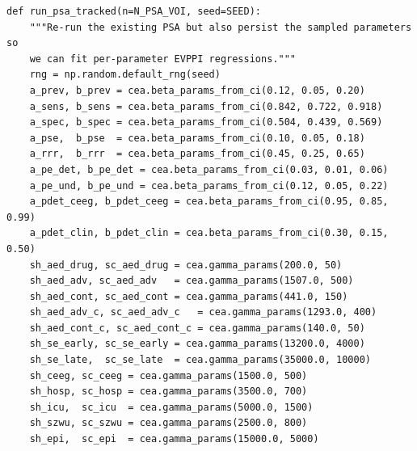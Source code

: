 \documentclass[11pt,a4paper]{article}
\begin{document}
\begin{lstlisting}[style=codeblock]
def run_psa_tracked(n=N_PSA_VOI, seed=SEED):
    """Re-run the existing PSA but also persist the sampled parameters so
    we can fit per-parameter EVPPI regressions."""
    rng = np.random.default_rng(seed)
    a_prev, b_prev = cea.beta_params_from_ci(0.12, 0.05, 0.20)
    a_sens, b_sens = cea.beta_params_from_ci(0.842, 0.722, 0.918)
    a_spec, b_spec = cea.beta_params_from_ci(0.504, 0.439, 0.569)
    a_pse,  b_pse  = cea.beta_params_from_ci(0.10, 0.05, 0.18)
    a_rrr,  b_rrr  = cea.beta_params_from_ci(0.45, 0.25, 0.65)
    a_pe_det, b_pe_det = cea.beta_params_from_ci(0.03, 0.01, 0.06)
    a_pe_und, b_pe_und = cea.beta_params_from_ci(0.12, 0.05, 0.22)
    a_pdet_ceeg, b_pdet_ceeg = cea.beta_params_from_ci(0.95, 0.85, 0.99)
    a_pdet_clin, b_pdet_clin = cea.beta_params_from_ci(0.30, 0.15, 0.50)
    sh_aed_drug, sc_aed_drug = cea.gamma_params(200.0, 50)
    sh_aed_adv, sc_aed_adv   = cea.gamma_params(1507.0, 500)
    sh_aed_cont, sc_aed_cont = cea.gamma_params(441.0, 150)
    sh_aed_adv_c, sc_aed_adv_c   = cea.gamma_params(1293.0, 400)
    sh_aed_cont_c, sc_aed_cont_c = cea.gamma_params(140.0, 50)
    sh_se_early, sc_se_early = cea.gamma_params(13200.0, 4000)
    sh_se_late,  sc_se_late  = cea.gamma_params(35000.0, 10000)
    sh_ceeg, sc_ceeg = cea.gamma_params(1500.0, 500)
    sh_hosp, sc_hosp = cea.gamma_params(3500.0, 700)
    sh_icu,  sc_icu  = cea.gamma_params(5000.0, 1500)
    sh_szwu, sc_szwu = cea.gamma_params(2500.0, 800)
    sh_epi,  sc_epi  = cea.gamma_params(15000.0, 5000)


\end{lstlisting}
\end{document}
